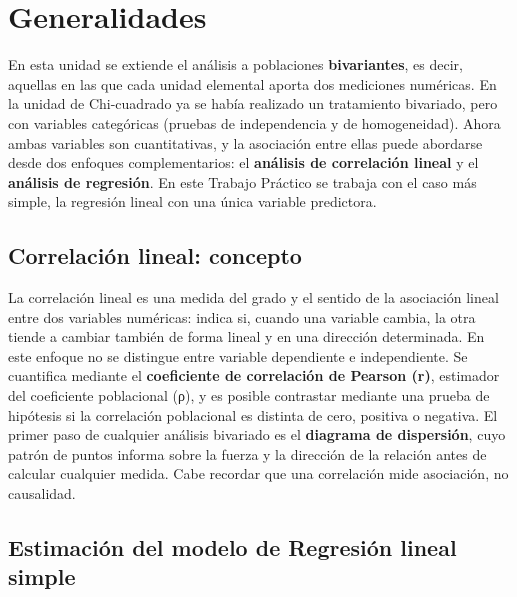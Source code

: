 \documentclass[
  spanish,
  letterpaper,
  DIV=11,
  numbers=noendperiod]{scrreprt}
\begin{document}
\section{Generalidades}\label{generalidades-6}

En esta unidad se extiende el análisis a poblaciones
\textbf{bivariantes}, es decir, aquellas en las que cada unidad
elemental aporta dos mediciones numéricas. En la unidad de Chi-cuadrado
ya se había realizado un tratamiento bivariado, pero con variables
categóricas (pruebas de independencia y de homogeneidad). Ahora ambas
variables son cuantitativas, y la asociación entre ellas puede abordarse
desde dos enfoques complementarios: el \textbf{análisis de correlación
lineal} y el \textbf{análisis de regresión}. En este Trabajo Práctico se
trabaja con el caso más simple, la regresión lineal con una única
variable predictora.

\subsection{Correlación lineal:
concepto}\label{correlaciuxf3n-lineal-concepto}

La correlación lineal es una medida del grado y el sentido de la
asociación lineal entre dos variables numéricas: indica si, cuando una
variable cambia, la otra tiende a cambiar también de forma lineal y en
una dirección determinada. En este enfoque no se distingue entre
variable dependiente e independiente. Se cuantifica mediante el
\textbf{coeficiente de correlación de Pearson (r)}, estimador del
coeficiente poblacional (ρ), y es posible contrastar mediante una prueba
de hipótesis si la correlación poblacional es distinta de cero, positiva
o negativa. El primer paso de cualquier análisis bivariado es el
\textbf{diagrama de dispersión}, cuyo patrón de puntos informa sobre la
fuerza y la dirección de la relación antes de calcular cualquier medida.
Cabe recordar que una correlación mide asociación, no causalidad.

\subsection{Estimación del modelo de Regresión lineal
simple}\label{estimaciuxf3n-del-modelo-de-regresiuxf3n-lineal-simple}
\end{document}
